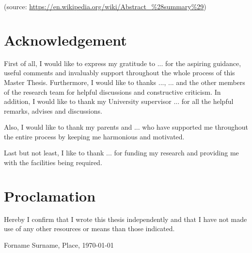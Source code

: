 \documentclass[11pt, a4paper, twoside, openright, final]{book}
\makeatletter
\numberwithin{equation}{chapter}		%
\renewcommand*{\cleardoublepage}{\clearpage\if@twoside \ifodd\c@page\else
\hbox{}%
\thispagestyle{empty}%
\newpage%
\if@twocolumn\hbox{}\newpage\fi\fi\fi}
\newcommand{\1}{\mathbbm{1}}
\makeatother
\begin{document}
(source: \url{https://en.wikipedia.org/wiki/Abstract_\%28summary\%29})




\tableofcontents
\cleardoublepage


\setcounter{page}{1}	%











\cleardoublepage
\chapter*{Acknowledgement}
\label{c:acknowledgement}

First of all, I would like to express my gratitude to ... for the aspiring guidance, useful comments and invaluably support throughout the whole process of this Master Thesis. Furthermore, I would like to thanks ..., ... and the other members of the research team for helpful discussions and constructive criticism. In addition, I would like to thank my University supervisor ... for all the helpful remarks, advises and discussions.

Also, I would like to thank my parents and ... who have supported me throughout the entire process by keeping me harmonious and motivated. 

Last but not least, I like to thank ... for funding my research and providing me with the facilities being required.



\listoffigures



\cleardoublepage





\cleardoublepage
\chapter*{Proclamation}
Hereby I confirm that I wrote this thesis independently and that I have not made use of any other resources or means than those indicated.
\bigskip\bigskip\bigskip\bigskip\bigskip\bigskip\bigskip\bigskip
\begin{flushright}
	Forname Surname, Place, \today
\end{flushright}
\end{document}
